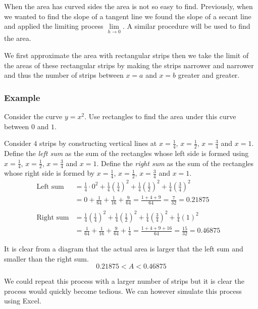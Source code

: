 When the area has curved sides the area is not so easy to find. Previously,
when we wanted to find the slope of a tangent line we found the slope of a secant line and applied the limiting process $\underset{h \rightarrow 0}{\lim }$. A similar procedure will be used to find the area. 

We first approximate
the area with rectangular strips then we take the limit of the areas of these rectangular strips by making the strips narrower and narrower and thus the
number of strips between $x =a$ and $x =b$ greater and greater. 

\subsubsection{Example}
Consider the curve $y =x^{2}$. Use rectangles to find the area under this curve between $0$ and $1$. 

Consider $4$ strips by constructing vertical lines at $x =\frac{1}{4}$, $x =\frac{1}{2}$, $x =\frac{3}{4}$ and $x =1$. Define the \emph{left sum} as the sum of the rectangles whose
left side is formed using $x =\frac{1}{4}$, $x =\frac{1}{2}$, $x =\frac{3}{4}$ and $x =1$. Define the \emph{right sum} as the sum of the rectangles whose
right side is formed by $x =\frac{1}{4}$, $x =\frac{1}{2}$, $x =\frac{3}{4}$ and $x =1$.
\begin{align*}\text{Left sum} &  = \frac{1}{4} \cdot 0^{2} +\frac{1}{4} \genfrac{(}{)}{}{}{1}{4}^{2} +\frac{1}{4} \genfrac{(}{)}{}{}{1}{2}^{2} +\frac{1}{4} \genfrac{(}{)}{}{}{3}{4}^{2} \\
 &  = 0 +\frac{1}{64} +\frac{1}{16} +\frac{9}{64} =\frac{1 +4 +9}{64} =\frac{7}{32} =0.21875 \\
\, &  &  \\
\text{Right sum} &  = \frac{1}{4} \genfrac{(}{)}{}{}{1}{4}^{2} +\frac{1}{4} \genfrac{(}{)}{}{}{1}{2}^{2} +\frac{1}{4} \genfrac{(}{)}{}{}{3}{4}^{2} +\frac{1}{4} \left (1\right )^{2} \\
 &  = \frac{1}{64} +\frac{1}{16} +\frac{9}{64} +\frac{1}{4} =\frac{1 +4 +9 +16}{64} =\frac{15}{32} =0.46875\end{align*}

It is clear from a diagram that the actual area is larger that the left sum and smaller than the
right sum.
\begin{equation*}0.21875 <A <0.46875
\end{equation*}

We could repeat this process with a larger number of strips but it is clear the process
would quickly become tedious. We can however simulate this process using Excel. 

